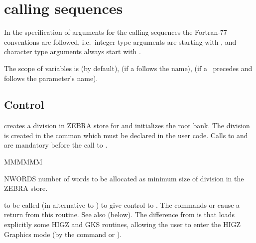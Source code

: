 \def\Vskip{\vspace{\baselineskip}}
\chapter{\KUIP{} calling sequences}

In the specification of arguments for the \KUIP{} calling sequences
the Fortran-77 conventions are followed,
i.e.\ integer type arguments are starting with , and
character type arguments always start with .

The scope of variables is  (by default),
 (if a \Lit{*} follows the name),  
(if a~\Lit{*} precedes and follows the parameter's name).
\section{Control}

\Action creates a division in ZEBRA store for \KUIP{}
and initializes the root bank.
The division is
created in the common  which must be declared in the
user code. Calls
to  and  are mandatory before the call to .
\Pdesc\begin{DLtt}{MMMMMM}
\item[NWORDS] number of words to be allocated as minimum
size of \KUIP{} division in the ZEBRA store.
\end{DLtt}

\Vskip{}
\Action to be called (in alternative to ) to give control to \KUIP{}.
The commands  or
 cause a return from this routine.
See also  (below).
The difference from  is that  loads explicitly some
HIGZ \cite{bib-HIGZ} and GKS \cite{bib-GKS1} routines, allowing the user
to enter the HIGZ Graphics mode (by the command  or 
).

